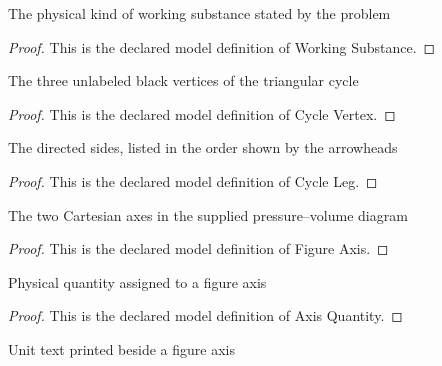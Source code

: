 \begin{definition}
  \label{def:physics:phyx-mini-0418:phyxminiproblems-problemphyxmini0418-workingsubstance}
  The physical kind of working substance stated by the problem
\end{definition}
\begin{proof}
  This is the declared model definition of Working Substance.
\end{proof}
\begin{definition}
  \label{def:physics:phyx-mini-0418:phyxminiproblems-problemphyxmini0418-cyclevertex}
  The three unlabeled black vertices of the triangular cycle
\end{definition}
\begin{proof}
  This is the declared model definition of Cycle Vertex.
\end{proof}
\begin{definition}
  \label{def:physics:phyx-mini-0418:phyxminiproblems-problemphyxmini0418-cycleleg}
  The directed sides, listed in the order shown by the arrowheads
\end{definition}
\begin{proof}
  This is the declared model definition of Cycle Leg.
\end{proof}
\begin{definition}
  \label{def:physics:phyx-mini-0418:phyxminiproblems-problemphyxmini0418-figureaxis}
  The two Cartesian axes in the supplied pressure--volume diagram
\end{definition}
\begin{proof}
  This is the declared model definition of Figure Axis.
\end{proof}
\begin{definition}
  \label{def:physics:phyx-mini-0418:phyxminiproblems-problemphyxmini0418-axisquantity}
  Physical quantity assigned to a figure axis
\end{definition}
\begin{proof}
  This is the declared model definition of Axis Quantity.
\end{proof}
\begin{definition}
  \label{def:physics:phyx-mini-0418:phyxminiproblems-problemphyxmini0418-axisdisplayunit}
  Unit text printed beside a figure axis
\end{definition}
